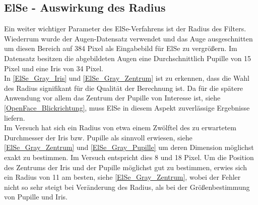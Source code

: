 \subsection{ElSe - Auswirkung des Radius}
Ein weiter wichtiger Parameter des ElSe-Verfahrens ist der Radius des Filters. Wiederrum wurde der Augen-Datensatz \cite{database_Eye} verwendet und das Auge ausgeschnitten um diesen Bereich auf 384 Pixel als Eingabebild für ElSe zu vergrößern. Im Datensatz besitzen die abgebildeten Augen eine Durchschnittlich Pupille von 15 Pixel und eine Iris von 34 Pixel.\\
In \autoref{ElSe_Gray_Iris} und \autoref{ElSe_Gray_Zentrum} ist zu erkennen, dass die Wahl des Radius signifikant für die Qualität der Berechnung ist. Da für die spätere Anwendung vor allem das Zentrum der Pupille von Interesse ist, siehe \autoref{OpenFace_Blickrichtung}, muss ElSe in diesem Aspekt zuverlässige Ergebnisse liefern.\\
Im Versuch hat sich ein Radius von etwa einem Zwölftel des zu erwartetem Durchmesser der Iris bzw. Pupille als sinnvoll erwiesen, siehe \autoref{ElSe_Gray_Zentrum} und \autoref{ElSe_Gray_Pupille} um deren Dimension möglichst exakt zu bestimmen. Im Versuch entspricht dies 8 und 18 Pixel. Um die Position des Zentrums  der Iris und der Pupille möglichst gut zu bestimmen, erwies sich ein Radius von 11 am besten, siehe \autoref{ElSe_Gray_Zentrum}, wobei der Fehler nicht so sehr steigt bei Veränderung des Radius, als bei der Größenbestimmung von Pupille und Iris.
